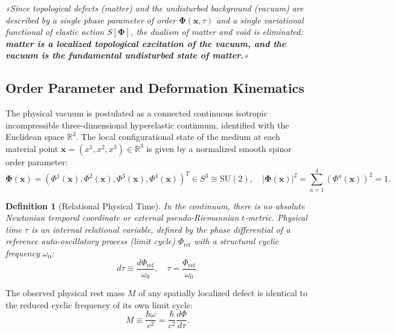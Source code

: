 \documentclass[12pt,a4paper]{article}
\newtheorem{definition}{Definition}
\begin{document}
	\begin{center}
		\textit{«Since topological defects (matter) and the undisturbed background (vacuum) are described by a single phase parameter of order $\boldsymbol{\Phi}(\mathbf{x}, \tau)$ and a single variational functional of elastic action $S[\boldsymbol{\Phi}]$, the dualism of matter and void is eliminated: \textbf{matter is a localized topological excitation of the vacuum, and the vacuum is the fundamental undisturbed state of matter.}»}
	\end{center}
	
	\subsection{Order Parameter and Deformation Kinematics}
	The physical vacuum is postulated as a connected continuous isotropic incompressible three-dimensional hyperelastic continuum, identified with the Euclidean space $\mathbb{R}^3$. The local configurational state of the medium at each material point $\mathbf{x} = (x^1, x^2, x^3) \in \mathbb{R}^3$ is given by a normalized smooth spinor order parameter:
	\begin{equation}
		\boldsymbol{\Phi}(\mathbf{x}) = \left(\Phi^1(\mathbf{x}), \Phi^2(\mathbf{x}), \Phi^3(\mathbf{x}), \Phi^4(\mathbf{x})\right)^T \in S^3 \cong \mathrm{SU}(2), \quad |\boldsymbol{\Phi}(\mathbf{x})|^2 = \sum_{a=1}^4 (\Phi^a(\mathbf{x}))^2 = 1.
	\end{equation}
	
	\begin{definition}[Relational Physical Time]
		In the continuum, there is no absolute Newtonian temporal coordinate or external pseudo-Riemannian $t$-metric. Physical time $\tau$ is an internal relational variable, defined by the phase differential of a reference auto-oscillatory process (limit cycle) $\Phi_{\text{ref}}$ with a structural cyclic frequency $\omega_0$:
		\begin{equation}
			d\tau \equiv \frac{d\Phi_{\text{ref}}}{\omega_0}, \quad \tau = \frac{\Phi_{\text{ref}}}{\omega_0}.
		\end{equation}
	\end{definition}
	
	The observed physical rest mass $M$ of any spatially localized defect is identical to the reduced cyclic frequency of its own limit cycle:
	\begin{equation}
		M \equiv \frac{\hbar \omega}{c^2} = \frac{\hbar}{c^2} \frac{d\Phi}{d\tau}.
	\end{equation}
	
\end{document}
